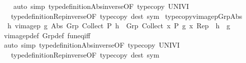 \begin{isabellebody}
\ \ \isamarkupfalse%
\ {\isacharparenleft}{\kern0pt}auto\ simp{\isacharcolon}{\kern0pt}\ type{\isacharunderscore}{\kern0pt}definition{\isachardot}{\kern0pt}Abs{\isacharunderscore}{\kern0pt}inverse{\isacharbrackleft}{\kern0pt}OF\ type{\isacharunderscore}{\kern0pt}copy\ UNIV{\isacharunderscore}{\kern0pt}I{\isacharbrackright}{\kern0pt}\isanewline
\ \ \ type{\isacharunderscore}{\kern0pt}definition{\isachardot}{\kern0pt}Rep{\isacharunderscore}{\kern0pt}inverse{\isacharbrackleft}{\kern0pt}OF\ type{\isacharunderscore}{\kern0pt}copy{\isacharbrackright}{\kern0pt}\ dest{\isacharcolon}{\kern0pt}\ sym{\isacharparenright}{\kern0pt}%
\endisatagproof
{\isafoldproof}%
%
\isadelimproof
\isanewline
%
\endisadelimproof
\isanewline
{}\isamarkupfalse%
\ type{\isacharunderscore}{\kern0pt}copy{\isacharunderscore}{\kern0pt}vimage{}p{\isacharunderscore}{\kern0pt}Grp{\isacharunderscore}{\kern0pt}Abs{\isacharcolon}{\kern0pt}\isanewline
\ \ {\isachardoublequoteopen}{\isasymAnd}h{\isachardot}{\kern0pt}\ vimage{}p\ g\ Abs\ {\isacharparenleft}{\kern0pt}Grp\ {\isacharparenleft}{\kern0pt}Collect\ P{\isacharparenright}{\kern0pt}\ h{\isacharparenright}{\kern0pt}\ {\isacharequal}{\kern0pt}\ Grp\ {\isacharparenleft}{\kern0pt}Collect\ {\isacharparenleft}{\kern0pt}{\isasymlambda}x{\isachardot}{\kern0pt}\ P\ {\isacharparenleft}{\kern0pt}g\ x{\isacharparenright}{\kern0pt}{\isacharparenright}{\kern0pt}{\isacharparenright}{\kern0pt}\ {\isacharparenleft}{\kern0pt}Rep\ {\isasymcirc}\ h\ {\isasymcirc}\ g{\isacharparenright}{\kern0pt}{\isachardoublequoteclose}\isanewline
%
\isadelimproof
\ \ %
\endisadelimproof
%
\isatagproof
{}\isamarkupfalse%
\ vimage{}p{\isacharunderscore}{\kern0pt}def\ Grp{\isacharunderscore}{\kern0pt}def\ fun{\isacharunderscore}{\kern0pt}eq{\isacharunderscore}{\kern0pt}iff\isanewline
\ \ \isamarkupfalse%
\ {\isacharparenleft}{\kern0pt}auto\ simp{\isacharcolon}{\kern0pt}\ type{\isacharunderscore}{\kern0pt}definition{\isachardot}{\kern0pt}Abs{\isacharunderscore}{\kern0pt}inverse{\isacharbrackleft}{\kern0pt}OF\ type{\isacharunderscore}{\kern0pt}copy\ UNIV{\isacharunderscore}{\kern0pt}I{\isacharbrackright}{\kern0pt}\isanewline
\ \ \ type{\isacharunderscore}{\kern0pt}definition{\isachardot}{\kern0pt}Rep{\isacharunderscore}{\kern0pt}inverse{\isacharbrackleft}{\kern0pt}OF\ type{\isacharunderscore}{\kern0pt}copy{\isacharbrackright}{\kern0pt}\ dest{\isacharcolon}{\kern0pt}\ sym{\isacharparenright}{\kern0pt}%
\endisatagproof
{\isafoldproof}%
%
\isadelimproof
\isanewline
%
\endisadelimproof

\end{isabellebody}
